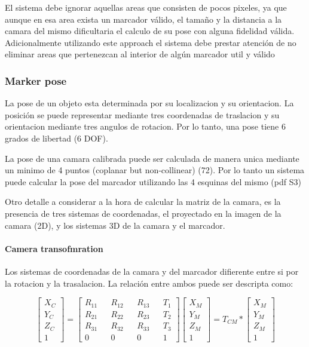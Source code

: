 \documentclass[runningheads]{llncs}
\begin{document}
El sistema debe ignorar aquellas areas que consisten de pocos pixeles, ya que aunque en esa area exista un marcador válido, el tamaño y la distancia a la camara del mismo dificultaria el calculo de su pose con alguna fidelidad válida. Adicionalmente utilizando este approach el sistema debe prestar atención de no eliminar areas que pertenezcan al interior de algún marcador util y válido

\subsubsection{Marker pose}

La pose de un objeto esta determinada por su localizacion y su orientacion. La posición se puede representar mediante tres coordenadas de traslacion y su orientacion mediante tres angulos de rotacion. Por lo tanto, una pose tiene 6 grados de libertad (6 DOF).

La pose de una camara calibrada puede ser calculada de manera unica mediante un minimo de 4 puntos (coplanar but non-collinear) (72). Por lo tanto un sistema puede calcular la pose del marcador utilizando las 4 esquinas del mismo (pdf S3)

Otro detalle a considerar a la hora de calcular la matriz de la camara, es la presencia de tres sistemas de coordenadas, el proyectado en la imagen de la camara (2D), y los sistemas 3D de la camara y el marcador.

\paragraph{Camera transofmration}
Los sistemas de coordenadas de la camara y del marcador difierente entre si por la rotacion y la trasalacion. La relación entre ambos puede ser descripta como:

\[
\begin{bmatrix}
X_{C} \\
Y_{C} \\
Z_{C} \\
1
\end{bmatrix} =
\begin{bmatrix}
R_{11} && R_{12} && R_{13} && T_{1} \\
R_{21} && R_{22} && R_{23} && T_{2} \\
R_{31} && R_{32} && R_{33} && T_{3} \\
0 && 0 && 0 && 1
\end{bmatrix}
\begin{bmatrix}
X_{M} \\
Y_{M} \\
Z_{M} \\
1
\end{bmatrix} = 
T_{CM} * \begin{bmatrix}
X_{M} \\
Y_{M} \\
Z_{M} \\
1
\end{bmatrix}
\]
\end{document}
